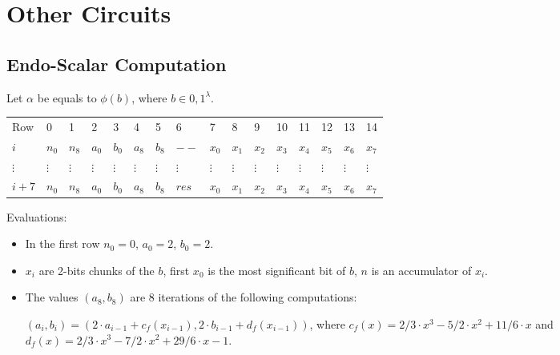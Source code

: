 \section{Other Circuits}
\label{section:other}

\subsection{Endo-Scalar Computation}
Let $\alpha$ be equals to $\phi(b)$, where $b \in {0,1}^{\lambda}$.
\begin{center}
    \begin{table}[H]
        \begin{tabular}{llllllllllllllll}
            Row    & 0        & 1        & 2        & 3        & 4        & 5        & 6        & 7        & 8        & 9        & 10       & 11       & 12       & 13       & 14       \\
            $i$   & $n_0$    & $n_8$    & $a_0$    & $b_0$    & $a_8$    & $b_8$   & $--$ & $x_0$      & $x_1$    & $x_2$    & $x_3$    & $x_4$    & $x_5$    & $x_6$ & $x_7$ \\
            $\vdots$ & $\vdots$ & $\vdots$ & $\vdots$ & $\vdots$ & $\vdots$ & $\vdots$ & $\vdots$ & $\vdots$ & $\vdots$ & $\vdots$ & $\vdots$ & $\vdots$ & $\vdots$ & $\vdots$ & $\vdots$ \\
            $i + 7$   & $n_0$    & $n_8$    & $a_0$    & $b_0$    & $a_8$    & $b_8$   & $res$ & $x_0$      & $x_1$    & $x_2$    & $x_3$    & $x_4$    & $x_5$    & $x_6$ & $x_7$ \\
        \end{tabular}
    \end{table}
\end{center}

Evaluations:
\begin{itemize}
	\item In the first row $n_0 = 0$, $a_0 = 2$, $b_0 = 2$.
	\item $x_i$ are 2-bits chunks of the $b$, first $x_0$ is the most significant bit of $b$, $n$ is an accumulator of $x_i$.
	\item The values $(a_8, b_8) $ are $8$ iterations of the following computations:
	\begin{center}
	$(a_i, b_i) = (2\cdot a_{i - 1} + c_f(x_{i - 1}), 2\cdot b_{i - 1} + d_f(x_{i - 1}))$, where $c_f(x) = 2/3\cdot x^3 - 5/2\cdot x^2 + 11/6 \cdot x$ and $d_f(x) = 2/3 \cdot x^3 - 7/2 \cdot x^2 + 29/6 \cdot x - 1$.
	\end{center}

\end{itemize}

